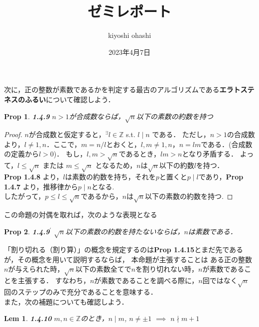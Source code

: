 \documentclass{jsarticle}
\title{ゼミレポート}
\author{kiyoshi ohashi}
\date{2023年4月7日}
\newtheorem*{prop}{Prop}
\newtheorem*{lem}{Lem}
\begin{document}
    \maketitle

    次に，正の整数が素数であるかを判定する最古のアルゴリズムである\textbf{エラトステネスのふるい}について確認しよう．

    \begin{prop}{\rm\bf 1.4.9}
      $n>1$が合成数ならば，$\sqrt{n}$以下の素数の約数を持つ
    \end{prop}

    \begin{proof}
      $n$が合成数と仮定すると，$^{\exists}l \in \mathbb{Z}$ s.t. $l \mid n$ である．
      ただし，$n>1$の合成数より，$ l \neq 1, n$．ここで，$m=n/l$とおくと，$l,m \neq 1,n$，$n = lm$である．(合成数の定義から$l>0$)．
      もし，$l,m > \sqrt{n}$であるとき，$lm > n$となり矛盾する．
      よって，$l \leq \sqrt{n}$ または $m \leq \sqrt{n}$ となるため，$n$は$\sqrt{n}$以下の約数$l$を持つ． \\
      \textbf{Prop 1.4.8} より，$l$は素数の約数を持ち，それを$p$と置くと$ p \mid l$であり，\textbf{Prop 1.4.7} より，推移律から$p \mid n$となる. \\
      したがって，$p \leq l \leq \sqrt{n}$であるから，$n$は$\sqrt{n}$以下の素数の約数を持つ.
    \end{proof}

    この命題の対偶を取れば，次のような表現となる

    \begin{prop}{\rm\bf 1.4.9${}^\text{$\prime$}$}
      $\sqrt{n}$以下の素数の約数を持たないならば，$n$は素数である．
    \end{prop}

    「割り切れる（割り算）」の概念を規定するのは\textbf{Prop 1.4.15}とまだ先であるが，その概念を用いて説明するならば，
    本命題が主張することは ある正の整数$n$が与えられた時，$\sqrt{n}$以下の素数全てで$n$を割り切れない時，$n$が素数であることを主張する．
    すなわち，$n$が素数であることを調べる際に，$n$回ではなく$\sqrt{n}$回のステップのみで充分であることを意味する． \\

    また，次の補題についても確認しよう．

    \begin{lem}{\rm\bf 1.4.10}
      $m, n \in \mathbb{Z}$のとき，$n \mid m$, $n \neq \pm 1$ $\implies$ $n \nmid m + 1$
    \end{lem}
\end{document}
